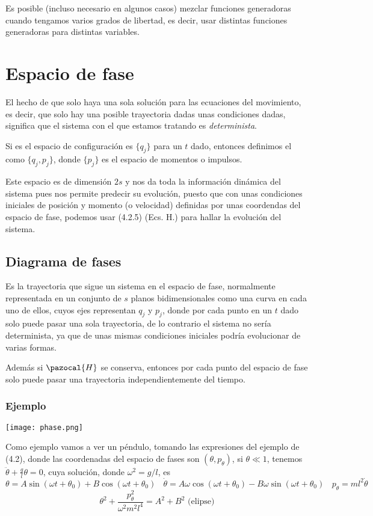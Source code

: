 Es posible (incluso necesario en algunos casos) mezclar funciones generadoras cuando tengamos varios grados de libertad, es decir, usar distintas funciones generadoras para distintas variables.
\section{Espacio de fase} 
El hecho de que solo haya una sola solución para las ecuaciones del movimiento, es decir, que solo hay una posible trayectoria dadas unas condiciones dadas, significa que el sistema con el que estamos tratando es \textit{determinista}.

Si es el espacio de configuración es $\{q_j\}$ para un $t$ dado, entonces definimos el  como $\{q_j,p_j\}$, donde $\{p_j\}$ es el espacio de momentos o impulsos.

Este espacio es de dimensión $2s$ y nos da toda la información dinámica del sistema pues nos permite predecir su evolución, puesto que con unas condiciones iniciales de posición y momento (o velocidad) definidas por unas coordendas del espacio de fase, podemos usar (4.2.5) (Ecs. H.) para hallar la evolución del sistema.
\subsection{Diagrama de fases}
Es la trayectoria que sigue un sistema en el espacio de fase, normalmente representada en un conjunto de $s$ planos bidimensionales como una curva en cada uno de ellos, cuyos ejes representan $q_j$ y $p_j$, donde por cada punto en un $t$ dado solo puede pasar una sola trayectoria, de lo contrario el sistema no sería determinista, ya que de unas mismas condiciones iniciales podría evolucionar de varias formas.

Además si $\pazocal{H}$ se conserva, entonces por cada punto del espacio de fase solo puede pasar una trayectoria independientemente del tiempo.

\subsubsection{Ejemplo}
\begin{marginfigure}[0cm]
	\texttt{[image: phase.png]}
\end{marginfigure}
Como ejemplo vamos a ver un péndulo, tomando las expresiones del ejemplo de (4.2), donde las coordenadas del espacio de fases son $(\theta,p_\theta)$, si $\theta \ll 1$, tenemos $\ddot{\theta}+\frac{g}{l}\theta=0$, cuya solución, donde $\omega^2=g/l$, es
\[\theta = A \sin{(\omega t + \theta_0)}+ B \cos{(\omega t + \theta_0)} \ \ \ \ \dot{\theta} = A\omega \cos{(\omega t + \theta_0)}- B \omega \sin{(\omega t + \theta_0)} \ \ \ \ p_\theta = ml^2 \dot{\theta}\]
\[\theta^2 + \frac{p_\theta^2}{\omega^2 m^2l^4}=A^2+B^2 \mbox{ (elipse)}\]
